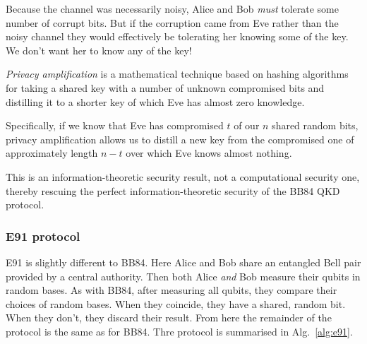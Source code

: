 Because the channel was necessarily noisy, Alice and Bob \textit{must} tolerate some number of corrupt bits. But if the corruption came from Eve rather than the noisy channel they would effectively be tolerating her knowing some of the key. We don't want her to know any of the key!

\textit{Privacy amplification} is a mathematical technique based on hashing algorithms for taking a shared key with a number of unknown compromised bits and distilling it to a shorter key of which Eve has almost zero knowledge.

Specifically, if we know that Eve has compromised $t$ of our $n$ shared random bits, privacy amplification allows us to distill a new key from the compromised one of approximately length \mbox{$n-t$} over which Eve knows almost nothing.

This is an information-theoretic security result, not a computational security one, thereby rescuing the perfect information-theoretic security of the BB84 QKD protocol.

%
%

\subsubsection{E91 protocol}

E91 is slightly different to BB84. Here Alice and Bob share an entangled Bell pair provided by a central authority. Then both Alice \textit{and} Bob measure their qubits in random bases. As with BB84, after measuring all qubits, they compare their choices of random bases. When they coincide, they have a shared, random bit. When they don't, they discard their result. From here the remainder of the protocol is the same as for BB84. Thre protocol is summarised in Alg.~\ref{alg:e91}.


